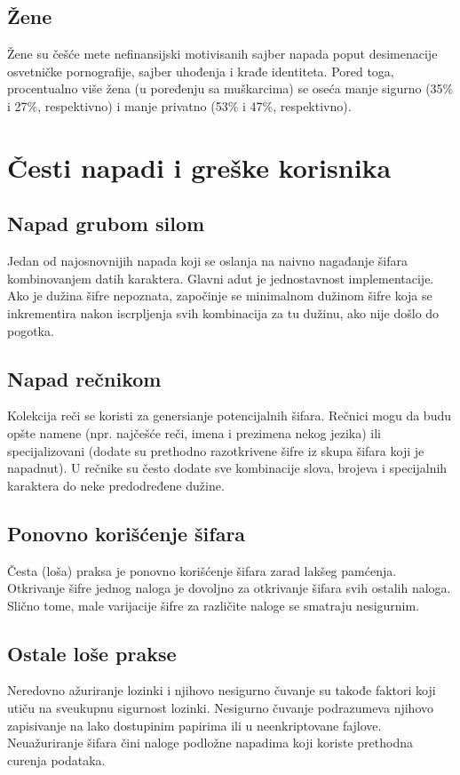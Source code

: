 \documentclass[fleqn, 12pt]{article}
\begin{document}
\subsection{Žene}
\indent Žene su češće mete nefinansijski motivisanih sajber napada poput desimenacije osvetničke pornografije, sajber uhođenja i krađe identiteta. Pored toga, procentualno više žena (u poređenju sa muškarcima) se oseća manje sigurno (35\% i 27\%, respektivno) i manje privatno (53\% i 47\%, respektivno). \cite{zene} \cite{zene2}


\newpage
\section{Česti napadi i greške korisnika}

\subsection{Napad grubom silom}
\indent Jedan od najosnovnijih napada koji se oslanja na naivno nagađanje šifara kombinovanjem datih karaktera. Glavni adut je jednostavnost implementacije. Ako je dužina šifre nepoznata, započinje se minimalnom dužinom šifre koja se inkrementira nakon iscrpljenja svih kombinacija za tu dužinu, ako nije došlo do pogotka.\cite{napadi}

\subsection{Napad rečnikom}
\indent Kolekcija reči se koristi za genersianje potencijalnih šifara. Rečnici mogu da budu opšte namene (npr. najčešće reči, imena i prezimena nekog jezika) ili specijalizovani (dodate su prethodno razotkrivene šifre iz skupa šifara koji je napadnut). U rečnike su često dodate sve kombinacije slova, brojeva i specijalnih karaktera do neke predodređene dužine. \cite{napadi}

\subsection{Ponovno korišćenje šifara}
\indent Česta (loša) praksa je ponovno korišćenje šifara zarad lakšeg pamćenja. Otkrivanje šifre jednog naloga je dovoljno za otkrivanje šifara svih ostalih naloga. Slično tome, male varijacije šifre za različite naloge se smatraju nesigurnim.

\subsection{Ostale loše prakse}
\indent Neredovno ažuriranje lozinki i njihovo nesigurno čuvanje su takođe faktori koji utiču na sveukupnu sigurnost lozinki. Nesigurno čuvanje podrazumeva njihovo zapisivanje na lako dostupinim papirima ili u neenkriptovane fajlove. Neuažuriranje šifara čini naloge podložne napadima koji koriste prethodna curenja podataka. 
\end{document}
